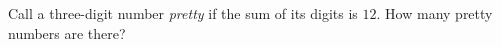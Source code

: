 Call a three-digit number \emph{pretty} if the sum of its digits is $12$. How many pretty numbers are there?
